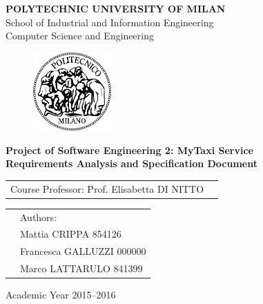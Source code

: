 \documentclass[a4paper, 12pt]{report}
\begin{document}
\begin{titlepage}

\begin{center}
\Large
\textbf{POLYTECHNIC UNIVERSITY OF MILAN} \\
\Large
School of Industrial and Information Engineering \\
Computer Science and Engineering
\end{center}

\addvspace{0.8cm}
\begin{figure}[h]
\begin{center}
\includegraphics[width=3cm]{cpt/img/polimi}
\end{center}
\end{figure}

\addvspace{0.1cm}
\begin{center}
\LARGE

\textbf{Project of Software Engineering 2: MyTaxi Service \\
Requirements Analysis and Specification Document}

\end{center}

\addvspace{0.5cm}
\Large
\begin{center}
\begin{tabular}{p{}p{}}
Course Professor: Prof. Elisabetta DI NITTO \\
\end{tabular}
\end{center}

\addvspace{0.6cm}
\Large
\begin{center}
\begin{tabular}{p{}p{}}
& Authors: \\
& Mattia 	CRIPPA		854126\\
& Francesca GALLUZZI	000000\\
& Marco 	LATTARULO	841399
\end{tabular}
\end{center}

\vfill
\Large
\begin{center}
Academic Year 2015--2016
\end{center}
\end{titlepage}
\end{document}
